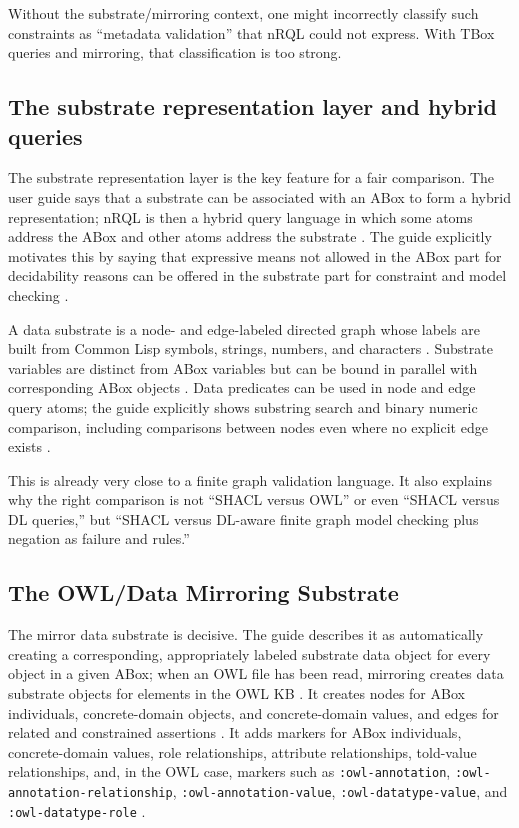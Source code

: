 \documentclass[11pt,letterpaper]{article}
\newcommand{\nrql}{nRQL}
\newcommand{\shacl}{SHACL}
\newcommand{\naf}{negation as failure}
\newcommand{\abox}{ABox}
\newcommand{\tbox}{TBox}
\newcommand{\owl}{OWL}
\begin{document}
Without the substrate/mirroring context, one might incorrectly classify such constraints as ``metadata validation'' that \nrql{} could not express. With \tbox{} queries and mirroring, that classification is too strong.

\subsection{The substrate representation layer and hybrid queries}

The substrate representation layer is the key feature for a fair comparison. The user guide says that a substrate can be associated with an \abox{} to form a hybrid representation; \nrql{} is then a hybrid query language in which some atoms address the \abox{} and other atoms address the substrate \cite[pp.~133--137]{racerug}. The guide explicitly motivates this by saying that expressive means not allowed in the \abox{} part for decidability reasons can be offered in the substrate part for constraint and model checking \cite[pp.~83--84]{racerug}.

A data substrate is a node- and edge-labeled directed graph whose labels are built from Common Lisp symbols, strings, numbers, and characters \cite[p.~133]{racerug}. Substrate variables are distinct from \abox{} variables but can be bound in parallel with corresponding \abox{} objects \cite[pp.~135--136]{racerug}. Data predicates can be used in node and edge query atoms; the guide explicitly shows substring search and binary numeric comparison, including comparisons between nodes even where no explicit edge exists \cite[pp.~136--137]{racerug}.

This is already very close to a finite graph validation language. It also explains why the right comparison is not ``\shacl{} versus \owl{}'' or even ``\shacl{} versus DL queries,'' but ``\shacl{} versus DL-aware finite graph model checking plus \naf{} and rules.''

\subsection{The OWL/Data Mirroring Substrate}

The mirror data substrate is decisive. The guide describes it as automatically creating a corresponding, appropriately labeled substrate data object for every object in a given \abox{}; when an \owl{} file has been read, mirroring creates data substrate objects for elements in the \owl{} KB \cite[p.~137]{racerug}. It creates nodes for \abox{} individuals, concrete-domain objects, and concrete-domain values, and edges for related and constrained assertions \cite[pp.~138--139]{racerug}. It adds markers for \abox{} individuals, concrete-domain values, role relationships, attribute relationships, told-value relationships, and, in the \owl{} case, markers such as \texttt{:owl-annotation}, \texttt{:owl-annotation-relationship}, \texttt{:owl-annotation-value}, \texttt{:owl-datatype-value}, and \texttt{:owl-datatype-role} \cite[pp.~140--141]{racerug}.
\end{document}
